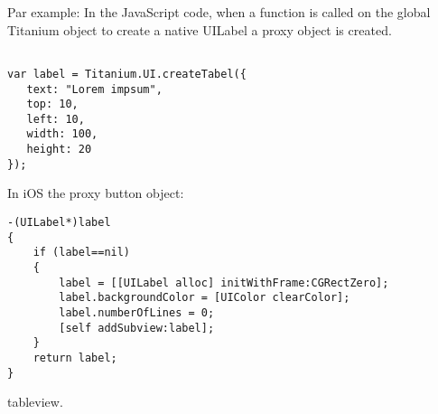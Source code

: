 Par example: In the JavaScript code, when a function is called on the global Titanium object to create a native UILabel a proxy object is created.

\begin{verbatim}

var label = Titanium.UI.createTabel({
   text: "Lorem impsum",
   top: 10,
   left: 10,
   width: 100,
   height: 20
});
\end{verbatim}


In iOS the proxy button object:

\begin{verbatim}
-(UILabel*)label
{
    if (label==nil)
    {
        label = [[UILabel alloc] initWithFrame:CGRectZero];
        label.backgroundColor = [UIColor clearColor];
        label.numberOfLines = 0;
        [self addSubview:label];
    }
    return label;
}
\end{verbatim}




tableview.